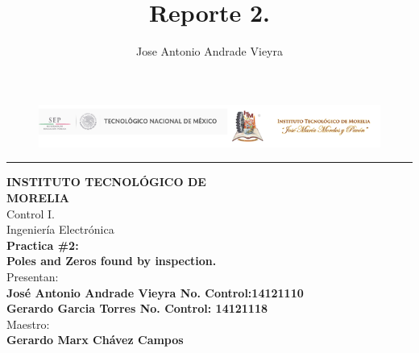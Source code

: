 \documentclass[12pt,a4paper]{article}
\author{Jose Antonio Andrade Vieyra}
\title{Reporte 2.}
\newcounter{ns}
\begin{document}
\begin{titlepage}
\begin{figure}[h!]
\centering
\includegraphics[scale=1]{LOGO.png}
\end{figure}
\hspace{1.3cm}\rule{14.5cm}{3pt} \hspace{-16.5cm}
\hspace{0.43cm} \hspace{0.43cm} \vspace{-19cm}
\begin{center}
\hspace{1.3cm} {\bf{\fontsize{20.74pt}{20.74pt} \selectfont INSTITUTO TECNOLÓGICO DE}}\\[0.5cm]
\hspace{1.3cm} {\bf{\fontsize{20.74pt}{20.74pt} \selectfont MORELIA}}\\[2cm]
\hspace{1.3cm} {\fontsize{20.74pt}{20.74pt} \selectfont Control I.}\\[1cm]
\hspace{1.3cm} {\fontsize{20.74pt}{20.74pt} \selectfont Ingeniería Electrónica}\\[1cm]
\hspace{1.3cm} {\bf{\fontsize{17.28pt}{17.28pt} \selectfont Practica \#2:}}\\[0.5cm]
\hspace{1.3cm} {\bf{\fontsize{17.28pt}{17.28pt} \selectfont Poles and Zeros found by inspection.}}\\[1.5cm]
\hspace{1.3cm} {\fontsize{17.28pt}{17.28pt} \selectfont Presentan:}\\[0.8cm]
\hspace{1.3cm} {\bf{\fontsize{14pt}{14pt} \selectfont José Antonio Andrade Vieyra No. Control:14121110}}\\[0.5cm]
\hspace{1.3cm} {\bf{\fontsize{14pt}{14pt} \selectfont Gerardo Garcia Torres No. Control: 14121118}}\\[1cm]
\hspace{1.3cm} {\fontsize{17.28pt}{17.28pt} \selectfont Maestro:}\\[0.5cm]
\hspace{1.3cm} {\bf{\fontsize{14pt}{14pt} \selectfont Gerardo Marx Chávez Campos}}
\end{center}   
\vspace{1.8cm}\hspace{1.3cm}
\end{titlepage}
\end{document}
